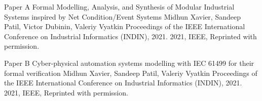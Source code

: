 \documentclass[12pt,a4paper,openright,final,twoside]{cseethesis}
\begin{document}

\def\paperheader{Paper A}
\def\papertitle{Formal Modelling, Analysis, and Synthesis of Modular Industrial Systems inspired by Net Condition/Event Systems}
\def\paperauthorstring{Midhun Xavier, Sandeep Patil, Victor Dubinin, Valeriy Vyatkin}
\def\referencestring{Proceedings of the IEEE International Conference on Industrial Informatics (INDIN), 2021.}
\def\copyrightstring{2021, IEEE, Reprinted with permission.}


\makepaperaccepted
  {\paperheader}
  {\papertitle}
  {\paperauthorstring}
  {\referencestring}
  {\copyrightstring}




\def\paperheader{Paper B}
\def\papertitle{Cyber-physical automation systems modelling with IEC 61499 for their formal verification}
\def\paperauthorstring{Midhun Xavier, Sandeep Patil, Valeriy Vyatkin}
\def\referencestring{Proceedings of the IEEE International Conference on Industrial Informatics (INDIN), 2021.}
\def\copyrightstring{2021, IEEE, Reprinted with permission.}


\makepaperaccepted
  {\paperheader}
  {\papertitle}
  {\paperauthorstring}
  {\referencestring}
  {\copyrightstring}


\def\paperheader{Paper C}
\def\papertitle{Formal verification of observers supervising a cyber-physical system implemented using IEC~61499}
\def\paperauthorstring{Polina Ovsiannikova, Etienne Le Priol, Vincent Perret, Pranay Jhunjhunwala, Midhun Xavier, and Valeriy Vyatkin}
\def\referencestring{Proceedings of the IEEE International Conference on Industrial Informatics (INDIN), 2021.}
\def\copyrightstring{2021, IEEE, Reprinted with permission.}
\end{document}

